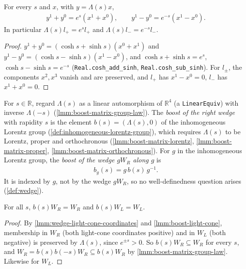 \begin{lemma}
    \label{lmm:boost-light-cone}
    \leanok
    For every $s$ and $x$, with $y = \Lambda(s)x$,
    \begin{align}
        y^1 + y^0 = e^{s}(x^1 + x^0), \qquad y^1 - y^0 = e^{-s}(x^1 - x^0).
    \end{align}
    In particular $\Lambda(s)l_+ = e^{s}l_+$ and $\Lambda(s)l_- = e^{-s}l_-$.
\end{lemma}
\begin{proof}
    \leanok
    $y^1 + y^0 = (\cosh s + \sinh s)(x^0 + x^1)$ and $y^1 - y^0 = (\cosh s - \sinh s)(x^1 - x^0)$, and $\cosh s + \sinh s = e^s$, $\cosh s - \sinh s = e^{-s}$ (\texttt{Real.cosh\_add\_sinh}, \texttt{Real.cosh\_sub\_sinh}). For $l_\pm$, the components $x^2, x^3$ vanish and are preserved, and $l_+$ has $x^1 - x^0 = 0$, $l_-$ has $x^1 + x^0 = 0$.
\end{proof}

\begin{definition}
    \label{def:wedge-boost}
    \leanok
    For $s \in \mathbb{R}$, regard $\Lambda(s)$ as a linear automorphism of $\mathbb{R}^4$ (a \texttt{LinearEquiv}) with inverse $\Lambda(-s)$ (\ref{lmm:boost-matrix-group-law}). The \emph{boost of the right wedge} with rapidity $s$ is the element $b(s) = (\Lambda(s), 0)$ of the inhomogeneous Lorentz group (\ref{def:inhomogeneous-lorentz-group}), which requires $\Lambda(s)$ to be Lorentz, proper and orthochronous (\ref{lmm:boost-matrix-lorentz}, \ref{lmm:boost-matrix-proper}, \ref{lmm:boost-matrix-orthochronous}). For $g$ in the inhomogeneous Lorentz group, the \emph{boost of the wedge $gW_R$ along $g$} is
    \begin{align}
        b_g(s) = g\, b(s)\, g^{-1}.
    \end{align}
    It is indexed by $g$, not by the wedge $gW_R$, so no well-definedness question arises (\ref{def:wedge}).
\end{definition}

\begin{lemma}
    \label{lmm:boost-preserves-wedge}
    \leanok
    For all $s$, $b(s)W_R = W_R$ and $b(s)W_L = W_L$.
\end{lemma}
\begin{proof}
    \leanok
    By \ref{lmm:wedge-light-cone-coordinates} and \ref{lmm:boost-light-cone}, membership in $W_R$ (both light-cone coordinates positive) and in $W_L$ (both negative) is preserved by $\Lambda(s)$, since $e^{\pm s} > 0$. So $b(s)W_R \subseteq W_R$ for every $s$, and $W_R = b(s)b(-s)W_R \subseteq b(s)W_R$ by \ref{lmm:boost-matrix-group-law}. Likewise for $W_L$.
\end{proof}

